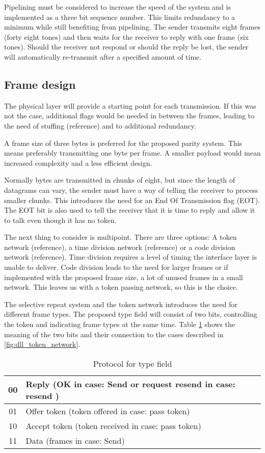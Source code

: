 Pipelining \cite[323]{KOM} must be considered to increase the speed of the
system and is implemented as a three bit sequence number. This limits redundancy to a minimum
while still benefiting from pipelining. The sender transmits eight frames
(forty eight tones) and then waits for the receiver to reply with one frame
(six tones). Should the receiver not respond or should the reply be lost, the
sender will automatically re-transmit after a specified amount of time.

\subsection{Frame design}\label{dll_frame_design}
The physical layer will provide a starting point for each
transmission. If this was not the case,
additional flags would be needed in between the frames, leading to the
need of stuffing (reference) and to additional redundancy.

A frame size of three bytes is preferred for the proposed parity system. This
means preferably transmitting one byte per frame. A smaller payload would mean
increased complexity and a less efficient design.

Normally bytes are transmitted in chunks of eight, but since the length of
datagrams can vary, the sender must have a way of telling the receiver to process smaller
chunks. This introduces the need for an End Of Transmission flag (EOT). The EOT
bit is also used to tell the receiver that it is time to reply and allow it to
talk even though it has no token.

The next thing to consider is multipoint. There are three options: A token
network (reference), a time division network (reference) or a code division
network (reference). Time division requires a level of timing the interface layer
is unable to deliver. Code division leads to the need for larger frames or if implemented with the
proposed frame size, a lot of unused frames in a small network. This leaves us
with a token passing network, so this is the choice.

The selective repeat system and the token network introduces the need for
different frame types. The proposed type field will consist of two bits,
controlling the token and indicating frame types at the same time. Table
\ref{tab:protocol_for_type_field} shows the meaning of the two bits and their
connection to the cases described in \ref{fig:dll_token_network}.

\begin{table}[htb]
	\centering
	\begin{tabular}{|c|l|}
		\hline
		00 &  Reply (OK in case: Send or request resend in case: resend
		)
		\\
		\hline
		01 &  Offer token (token offered in case: pass token) \\
		\hline
		10 &  Accept token (token received in case: pass token) \\
		\hline
		11 &  Data (frames in case: Send)\\
		\hline
	\end{tabular}
	\caption{Protocol for type field}
	\label{tab:protocol_for_type_field}
\end{table}

